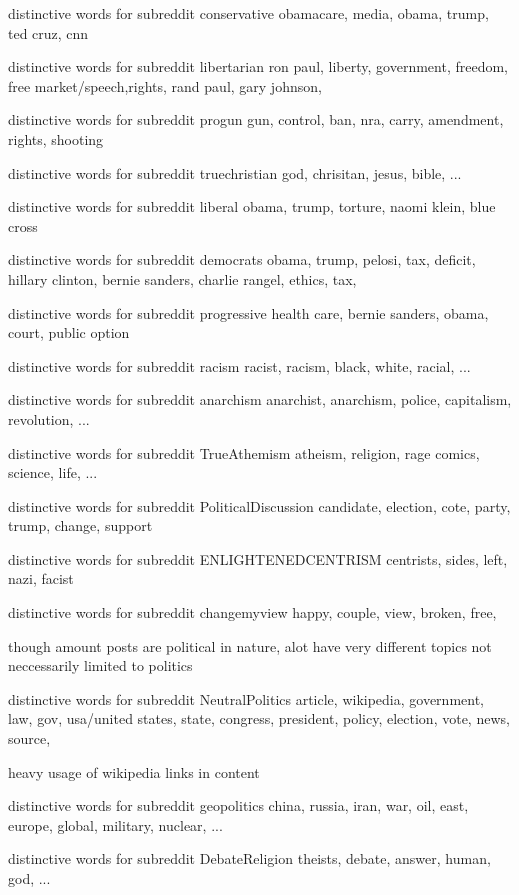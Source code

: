 distinctive words for subreddit conservative
obamacare, media, obama, trump, ted cruz, cnn 


distinctive words for subreddit libertarian
ron paul, liberty, government, freedom, free market/speech,rights, rand paul, gary johnson,  


distinctive words for subreddit progun
gun, control, ban, nra, carry, amendment, rights, shooting


distinctive words for subreddit truechristian
god, chrisitan, jesus, bible, ...


distinctive words for subreddit liberal
obama, trump, torture, naomi klein, blue cross


distinctive words for subreddit democrats
obama, trump, pelosi, tax, deficit, hillary clinton, bernie sanders, charlie rangel, ethics, tax,


distinctive words for subreddit progressive 
health care, bernie sanders, obama, court, public option


distinctive words for subreddit racism
racist, racism, black, white, racial, ...


distinctive words for subreddit anarchism
anarchist, anarchism, police, capitalism, revolution, ...


distinctive words for subreddit TrueAthemism
atheism, religion, rage comics, science, life, ...



distinctive words for subreddit PoliticalDiscussion
candidate, election, cote, party, trump, change, support


distinctive words for subreddit ENLIGHTENEDCENTRISM
centrists, sides, left, nazi, facist


distinctive words for subreddit changemyview
happy, couple, view, broken, free, 

though amount posts are political in nature, alot have very different topics not neccessarily limited to politics


distinctive words for subreddit NeutralPolitics
article, wikipedia, government, law, gov, usa/united states, state, congress, president, policy, election, vote, news, source, 

heavy usage of wikipedia links in content


distinctive words for subreddit geopolitics
china, russia, iran, war, oil, east, europe, global, military, nuclear, ...


distinctive words for subreddit DebateReligion
theists, debate, answer, human, god, ...


